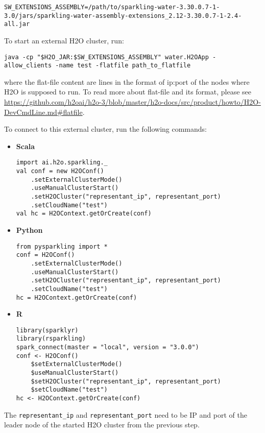 \begin{lstlisting}[style=bash]
SW_EXTENSIONS_ASSEMBLY=/path/to/sparkling-water-3.30.0.7-1-3.0/jars/sparkling-water-assembly-extensions_2.12-3.30.0.7-1-2.4-all.jar
\end{lstlisting}

To start an external H2O cluster, run:

\begin{lstlisting}[style=bash]
java -cp "$H2O_JAR:$SW_EXTENSIONS_ASSEMBLY" water.H2OApp -allow_clients -name test -flatfile path_to_flatfile
\end{lstlisting}


where the flat-file content are lines in the format of ip:port of the nodes where H2O is supposed to run. To
read more about flat-file and its format, please
see \url{https://github.com/h2oai/h2o-3/blob/master/h2o-docs/src/product/howto/H2O-DevCmdLine.md#flatfile}.


To connect to this external cluster, run the following commands:

\begin{itemize}
    \item \textbf{Scala} \begin{lstlisting}[style=Scala]
import ai.h2o.sparkling._
val conf = new H2OConf()
    .setExternalClusterMode()
    .useManualClusterStart()
    .setH2OCluster("representant_ip", representant_port)
    .setCloudName("test")
val hc = H2OContext.getOrCreate(conf)
    \end{lstlisting}
    \item \textbf{Python} \begin{lstlisting}[style=Python]
from pysparkling import *
conf = H2OConf()
    .setExternalClusterMode()
    .useManualClusterStart()
    .setH2OCluster("representant_ip", representant_port)
    .setCloudName("test")
hc = H2OContext.getOrCreate(conf)
    \end{lstlisting}
    \item \textbf{R} \begin{lstlisting}[style=R]
library(sparklyr)
library(rsparkling)
spark_connect(master = "local", version = "3.0.0")
conf <- H2OConf()
    $setExternalClusterMode()
    $useManualClusterStart()
    $setH2OCluster("representant_ip", representant_port)
    $setCloudName("test")
hc <- H2OContext.getOrCreate(conf)
    \end{lstlisting}
\end{itemize}

The \texttt{representant\_ip} and \texttt{representant\_port} need to be IP and port of the leader node of the started
H2O cluster from the previous step.

